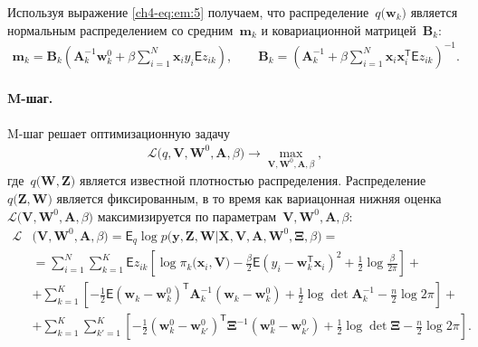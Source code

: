 Используя выражение \eqref{ch4-eq:em:5} получаем, что  распределение~$q\bigr(\mathbf{w}_{k}\bigr)$ является нормальным распределением со средним~$\mathbf{m}_{k}$ и ковариационной матрицей~$\mathbf{B}_k$:
\[
\label{ch4-eq:em:6}
\begin{aligned}
\mathbf{m}_{k} = \mathbf{B}_{k}\left(\mathbf{A}_{k}^{-1}\mathbf{w}_{k}^{0}+\beta\sum_{i=1}^{N}\mathbf{x}_{i}y_{i}\mathsf{E}z_{ik}\right), \qquad \mathbf{B}_{k} = \left(\mathbf{A}_{k}^{-1}+\beta\sum_{i=1}^{N}\mathbf{x}_{i}\mathbf{x}_{i}^{\mathsf{T}}\mathsf{E}z_{ik}\right)^{-1}.
\end{aligned}
\]

\paragraph{M-шаг.} M-шаг решает оптимизационную задачу
\[
\label{ch4-eq:em:new:3}
\begin{aligned}
\mathcal{L}\bigr(q, \textbf{V}, \textbf{W}^{0}, \textbf{A}, \beta\bigr) \to \max_{\textbf{V}, \textbf{W}^{0}, \textbf{A}, \beta},
\end{aligned}
\]
где~$q\bigr(\textbf{W}, \textbf{Z}\bigr)$ является известной плотностью распределения.
Распределение~$q\bigr(\mathbf{Z}, \mathbf{W}\bigr)$ является фиксированным, в то время как вариацонная нижняя оценка~$\mathcal{L}\bigr(\textbf{V}, \textbf{W}^{0}, \textbf{A}, \beta\bigr)$ максимизируется по параметрам~$\mathbf{V}, \mathbf{W}^0, \textbf{A},  \beta$:
\[
\label{ch4-eq:em:7}
\begin{aligned}
\mathcal{L}&\bigr(\textbf{V}, \textbf{W}^{0}, \textbf{A}, \beta\bigr) = \mathsf{E}_{q}\log p\bigr(\mathbf{y}, \mathbf{Z}, \mathbf{W}|\mathbf{X}, \mathbf{V}, \textbf{A}, \textbf{W}^{0}, \bm{\Xi}, \beta\bigr) =  \\
&= \sum_{i=1}^{N}\sum_{k=1}^{K}\mathsf{E}z_{ik}\left[\log\pi_k\bigr(\textbf{x}_i, \textbf{V}\bigr) - \frac{\beta}{2}\mathsf{E}\left(y_{i} - \textbf{w}_{k}^{\mathsf{T}}\textbf{x}_{i}\right)^{2} + \frac{1}{2}\log\frac{\beta}{2\pi}\right] +\\
&+ \sum_{k=1}^{K}\left[-\frac{1}{2}\mathsf{E}\left(\textbf{w}_{k} - \textbf{w}_{k}^{0}\right)^{\mathsf{T}}\textbf{A}_{k}^{-1}\left(\textbf{w}_{k} - \textbf{w}_{k}^{0}\right) + \frac{1}{2}\log\det\textbf{A}^{-1}_{k} - \frac{n}{2}\log2\pi\right] +\\
&+ \sum_{k=1}^{K}\sum_{k'=1}^{K}\left[-\frac{1}{2}\left(\textbf{w}_{k}^{0}-\textbf{w}_{k'}^{0}\right)^{\mathsf{T}}\bm{\Xi}^{-1}\left(\textbf{w}_{k}^{0}-\textbf{w}_{k'}^{0}\right) +\frac{1}{2}\log\det\bm{\Xi} -\frac{n}{2}\log{2\pi}\right].
\end{aligned}
\]
